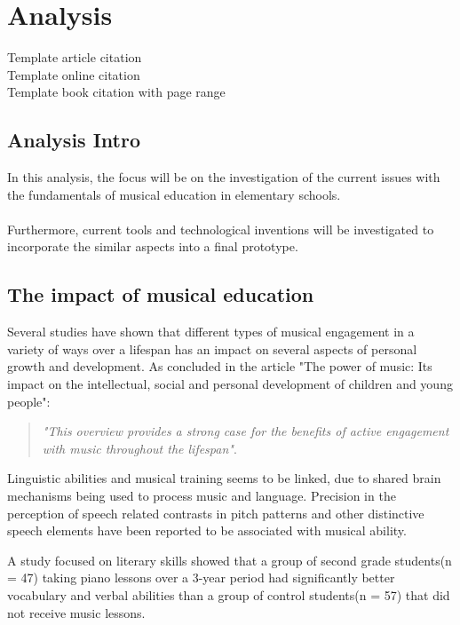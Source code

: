 \chapter{Analysis}
Template article citation\cite{articleTemplate}\\
Template online citation\cite{onlineTemplate}\\
Template book citation with page range\cite[p.~442-444]{interactionDesign}

\section{Analysis Intro}
In this analysis, the focus will be on the investigation of the current issues with the fundamentals of musical education in elementary schools.\\
\\
Furthermore, current tools and technological inventions will be investigated to incorporate the similar aspects into a final prototype.

\section{The impact of musical education}
Several studies have shown that different types of musical engagement in a variety of ways over a lifespan has an impact on several aspects of personal growth and development. As concluded in the article "The power of music: Its impact on the intellectual, social and personal development of children and young people":\\

\begin{quote}
	\textit{"This overview provides a strong case for the benefits of active engagement with music throughout the lifespan"}\cite{powerOfMusic}\label{quote:powerOfMusic}.\\
\end{quote}

Linguistic abilities and musical training seems to be linked, due to shared brain mechanisms being used to process music and language. Precision in the perception of speech related contrasts in pitch patterns and other distinctive speech elements have been reported to be associated with musical ability\cite{languageSkills}.

A study focused on literary skills showed that a group of second grade students(n = 47) taking piano lessons over a 3-year period had significantly better vocabulary and verbal abilities than a group of control students(n = 57) that did not receive music lessons\cite{vocabularySkills}.

